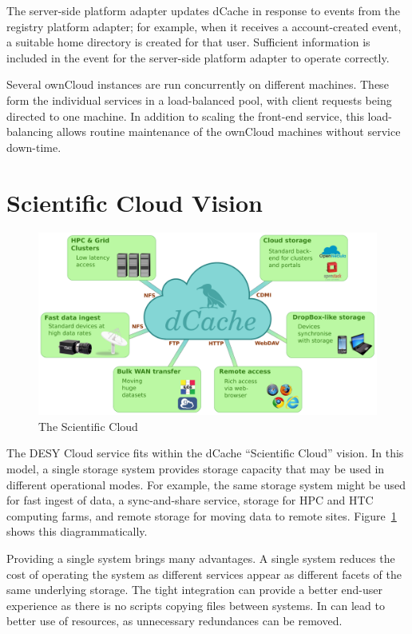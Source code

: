 \documentclass[a4paper]{jpconf}
\begin{document}
The server-side platform adapter updates dCache in response to events
from the registry platform adapter; for example, when it receives a
account-created event, a suitable home directory is created for that
user.  Sufficient information is included in the event for the
server-side platform adapter to operate correctly.

Several ownCloud instances are run concurrently on different machines.
These form the individual services in a load-balanced pool, with
client requests being directed to one machine.  In addition to scaling
the front-end service, this load-balancing allows routine maintenance
of the ownCloud machines without service down-time.

\section{Scientific Cloud Vision}

\begin{figure}
  \centering
  \includegraphics[width=\textwidth]{Figures/dCache-cloud}
  \caption{The Scientific Cloud}
  \label{fig:scicloud}
\end{figure}

The DESY Cloud service fits within the dCache ``Scientific Cloud''
vision.  In this model, a single storage system provides storage
capacity that may be used in different operational modes.  For
example, the same storage system might be used for fast ingest of
data, a sync-and-share service, storage for HPC and HTC computing
farms, and remote storage for moving data to remote sites.
Figure~\ref{fig:scicloud} shows this diagrammatically.

Providing a single system brings many advantages.  A single system
reduces the cost of operating the system as different services appear
as different facets of the same underlying storage.  The tight
integration can provide a better end-user experience as there is no
scripts copying files between systems.  In can lead to better use of
resources, as unnecessary redundances can be removed.
\end{document}
